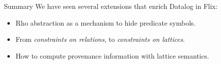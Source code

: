 \begin{frame}{Summary}
We have seen several extensions that enrich Datalog in Flix:

\begin{itemize}
    \item Rho abstraction as a mechanism to hide predicate symbols.
    \item From \emph{constraints on relations}, to \emph{constraints on
    lattices}.
    \item How to compute provenance information with lattice semantics.
\end{itemize}
\end{frame}

\begin{frame}[standout]
\end{frame}



